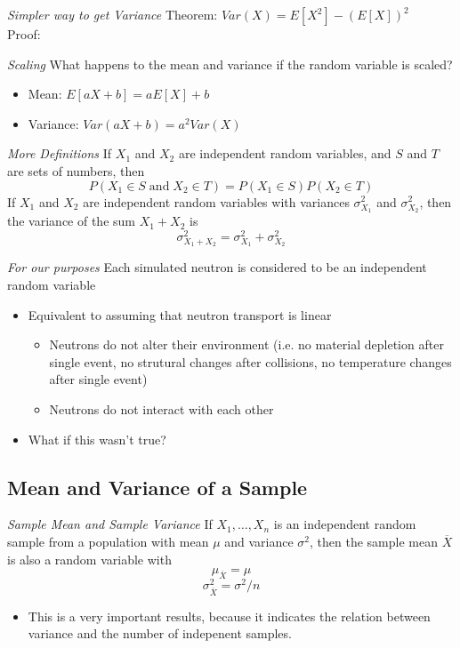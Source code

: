 \emph{Simpler way to get Variance}
 Theorem: $Var(X) = E[X^2] - (E[X])^2$\\
 Proof:


\emph{Scaling}
 What happens to the mean and variance if the random variable is scaled?
  \begin{itemize}
     \item Mean: $E[aX+b] = aE[X]+b$
     \item Variance: $Var(aX+b) = a^2 Var(X)$
  \end{itemize}


\emph{More Definitions}
 If $X_{1}$ and $X_{2}$ are independent random variables, and $S$ and $T$ are sets of numbers, then
  \begin{equation*}
    P(X_1 \in S \; \textrm{and} \; X_2 \in T) = P(X_1 \in S)P(X_2 \in T)
  \end{equation*}
 If $X_{1}$ and $X_{2}$ are independent random variables with variances $\sigma_{X_1}^2$ and $\sigma_{X_2}^2$, then the variance of the sum $X_1+X_2$ is
  \begin{equation*}
    \sigma_{X_1+X_2}^2 = \sigma_{X_1}^2 + \sigma_{X_2}^2 
  \end{equation*}


\emph{For our purposes}
 Each simulated neutron is considered to be an independent random variable
  \begin{itemize}
   \item Equivalent to assuming that neutron transport is linear
   \begin{itemize}
   \item Neutrons do not alter their environment (i.e. no material depletion after single event, no strutural changes after collisions, no temperature changes after single event)
   \item Neutrons do not interact with each other
   \end{itemize}
   \item What if this wasn't true?
  \end{itemize}


\subsection{Mean and Variance of a Sample}

\emph{Sample Mean and Sample Variance}
 If $X_1,\dots,X_n$ is an independent random sample from a population with mean $\mu$ and variance $\sigma^2$, then the sample mean $\overline{X}$ is also a random variable with
 \begin{equation*}
  \mu_{\overline{X}} = \mu
 \end{equation*}
 \begin{equation*}
  \sigma_{\overline{X}}^2=\sigma^2/n
 \end{equation*}
 \begin{itemize}
  \item This is a very important results, because it indicates the relation between variance and the number of indepenent samples.
 \end{itemize}



